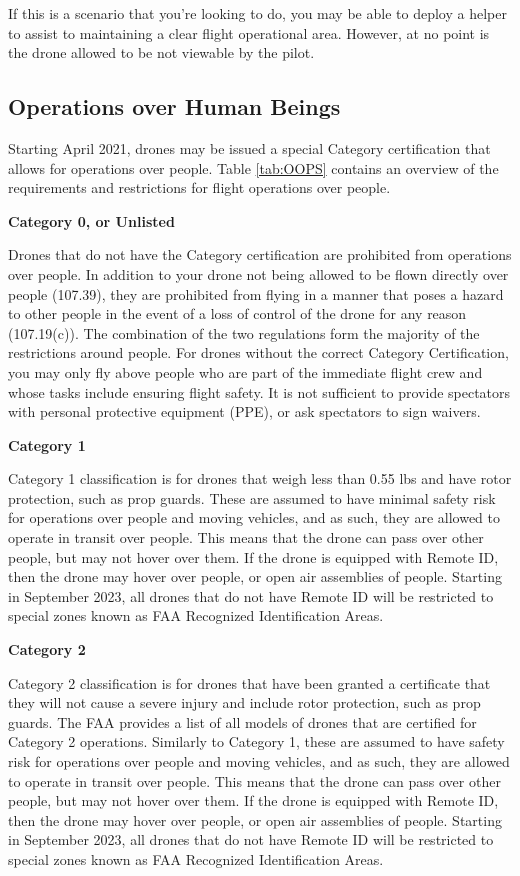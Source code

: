\documentclass[
  12pt,
]{book}
\begin{document}
If this is a scenario that you're looking to do, you may be able to deploy a helper to assist to maintaining a clear flight operational area. However, at no point is the drone allowed to be not viewable by the pilot.

\hypertarget{operations-over-human-beings}{%
\subsection{Operations over Human Beings}\label{operations-over-human-beings}}

Starting April 2021, drones may be issued a special Category certification that allows for operations over people. Table \ref{tab:OOPS} contains an overview of the requirements and restrictions for flight operations over people.

\textbf{Category 0, or Unlisted}

Drones that do not have the Category certification are prohibited from operations over people. In addition to your drone not being allowed to be flown directly over people (107.39), they are prohibited from flying in a manner that poses a hazard to other people in the event of a loss of control of the drone for any reason (107.19(c)). The combination of the two regulations form the majority of the restrictions around people. For drones without the correct Category Certification, you may only fly above people who are part of the immediate flight crew and whose tasks include ensuring flight safety. It is not sufficient to provide spectators with personal protective equipment (PPE), or ask spectators to sign waivers.

\textbf{Category 1}

Category 1 classification is for drones that weigh less than 0.55 lbs and have rotor protection, such as prop guards. These are assumed to have minimal safety risk for operations over people and moving vehicles, and as such, they are allowed to operate in transit over people. This means that the drone can pass over other people, but may not hover over them. If the drone is equipped with Remote ID, then the drone may hover over people, or open air assemblies of people. Starting in September 2023, all drones that do not have Remote ID will be restricted to special zones known as FAA Recognized Identification Areas.

\textbf{Category 2}

Category 2 classification is for drones that have been granted a certificate that they will not cause a severe injury and include rotor protection, such as prop guards. The FAA provides a list of all models of drones that are certified for Category 2 operations. Similarly to Category 1, these are assumed to have safety risk for operations over people and moving vehicles, and as such, they are allowed to operate in transit over people. This means that the drone can pass over other people, but may not hover over them. If the drone is equipped with Remote ID, then the drone may hover over people, or open air assemblies of people. Starting in September 2023, all drones that do not have Remote ID will be restricted to special zones known as FAA Recognized Identification Areas.
\end{document}
